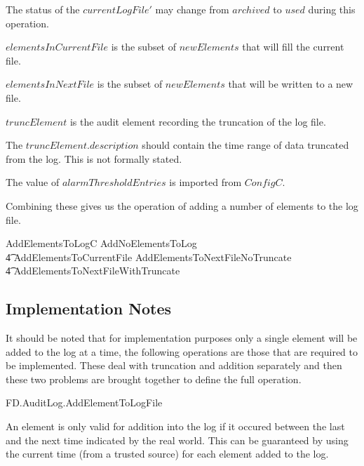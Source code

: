 \begin{Zcomment}
\item
The status of the $currentLogFile'$ may change from $archived$ to
$used$ during this operation.
\item
$elementsInCurrentFile$ is the subset of $newElements$ that will fill
the current file.
\item $elementsInNextFile$ is the subset of $newElements$ that will be
written to a new file.
\item $truncElement$ is the audit element recording the truncation of
the log file.
\item
The $truncElement.description$ should contain the time range of data truncated from
the log. This is not formally stated.
\item
The value of $alarmThresholdEntries$ is imported from $ConfigC$. 
\end{Zcomment}

Combining these gives us the operation of adding a number of elements
to the log file.

\begin{zed}
AddElementsToLogC  AddNoElementsToLog 
\\ \t4  \lor AddElementsToCurrentFile \lor
        AddElementsToNextFileNoTruncate 
\\ \t4   \lor AddElementsToNextFileWithTruncate
\end{zed}
\subsection{Implementation Notes}
It should be noted that for implementation purposes only a single
element will be added to the log at a time, the following operations
are those that are required to be implemented. These deal with
truncation and addition separately and then these two problems are
brought together to define the full operation.

\begin{traceunit}{FD.AuditLog.AddElementToLogFile}
\end{traceunit}

An element is only valid for addition into the log if it occured
between the last and the next time indicated by the real world. This
can be guaranteed by using the current time (from a trusted source) for
each element added to the log.

